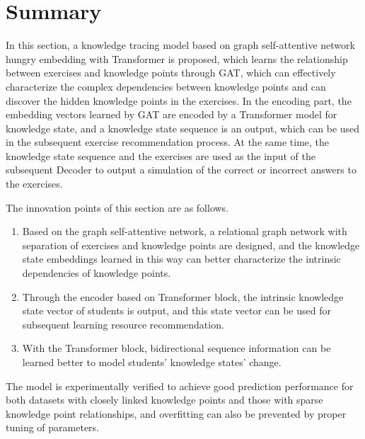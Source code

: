 \section{Summary}
%
In this section, a knowledge tracing model based on graph self-attentive network hungry embedding with Transformer is proposed, which learns the relationship between exercises and knowledge points through GAT, which can effectively characterize the complex dependencies between knowledge points and can discover the hidden knowledge points in the exercises. In the encoding part, the embedding vectors learned by GAT are encoded by a Transformer model for knowledge state, and a knowledge state sequence is an output, which can be used in the subsequent exercise recommendation process. At the same time, the knowledge state sequence and the exercises are used as the input of the subsequent Decoder to output a simulation of the correct or incorrect answers to the exercises.

The innovation points of this section are as follows.
\begin{enumerate}
	\item Based on the graph self-attentive network, a relational graph network with separation of exercises and knowledge points are designed, and the knowledge state embeddings learned in this way can better characterize the intrinsic dependencies of knowledge points.
	\item Through the encoder based on Transformer block, the intrinsic knowledge state vector of students is output, and this state vector can be used for subsequent learning resource recommendation.
	\item With the Transformer block, bidirectional sequence information can be learned better to model students' knowledge states' change.
\end{enumerate}

The model is experimentally verified to achieve good prediction performance for both datasets with closely linked knowledge points and those with sparse knowledge point relationships, and overfitting can also be prevented by proper tuning of parameters.